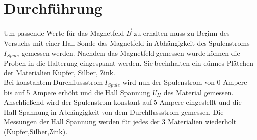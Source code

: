\newpage
\section{Durchführung}
\label{sec:Durchfuehrung}
Um passende Werte für das Magnetfeld $\vec{B}$ zu erhalten muss zu Beginn des Versuchs
mit einer Hall Sonde das Magnetfeld in Abhängigkeit des Spulenstroms $I_{Spule}$ gemessen werden.\newline
Nachdem das Magnetfeld gemessen wurde können die Proben in die Halterung eingespannt werden.
Sie beeinhalten ein dünnes Plätchen der Materialien Kupfer, Silber, Zink.\\
Bei konstantem Durchflussstrom $I_{Spule}$ wird nun der Spulenstrom von 0 Ampere bis auf 5 Ampere erhöht und die Hall Spannung $U_H$ 
des Material gemessen.\\
Anschließend wird der Spulenstrom konstant auf 5 Ampere eingestellt und die Hall Spannung in Abhängigkeit von dem Durchflussstrom gemessen.
Die Messungen der Hall Spannung werden für jedes der 3 Materialien wiederholt (Kupfer,Silber,Zink).